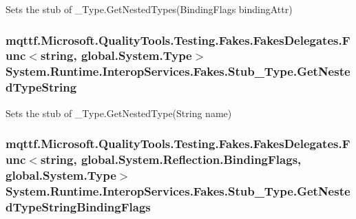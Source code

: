 Sets the stub of \-\_\-\-Type.\-Get\-Nested\-Types(\-Binding\-Flags binding\-Attr)

\hypertarget{class_system_1_1_runtime_1_1_interop_services_1_1_fakes_1_1_stub___type_af268199d2fbe3f0540d11de9ed9416a3}{
\subsubsection[{Get\-Nested\-Type\-String}]{\setlength{\rightskip}{0pt plus 5cm}mqttf.\-Microsoft.\-Quality\-Tools.\-Testing.\-Fakes.\-Fakes\-Delegates.\-Func$<$string, global.\-System.\-Type$>$ System.\-Runtime.\-Interop\-Services.\-Fakes.\-Stub\-\_\-\-Type.\-Get\-Nested\-Type\-String}}\label{class_system_1_1_runtime_1_1_interop_services_1_1_fakes_1_1_stub___type_af268199d2fbe3f0540d11de9ed9416a3}


Sets the stub of \-\_\-\-Type.\-Get\-Nested\-Type(\-String name)

\hypertarget{class_system_1_1_runtime_1_1_interop_services_1_1_fakes_1_1_stub___type_ac5bece8449357eeb5ccc14c76d0fd89a}{
\subsubsection[{Get\-Nested\-Type\-String\-Binding\-Flags}]{\setlength{\rightskip}{0pt plus 5cm}mqttf.\-Microsoft.\-Quality\-Tools.\-Testing.\-Fakes.\-Fakes\-Delegates.\-Func$<$string, global.\-System.\-Reflection.\-Binding\-Flags, global.\-System.\-Type$>$ System.\-Runtime.\-Interop\-Services.\-Fakes.\-Stub\-\_\-\-Type.\-Get\-Nested\-Type\-String\-Binding\-Flags}}\label{class_system_1_1_runtime_1_1_interop_services_1_1_fakes_1_1_stub___type_ac5bece8449357eeb5ccc14c76d0fd89a}


